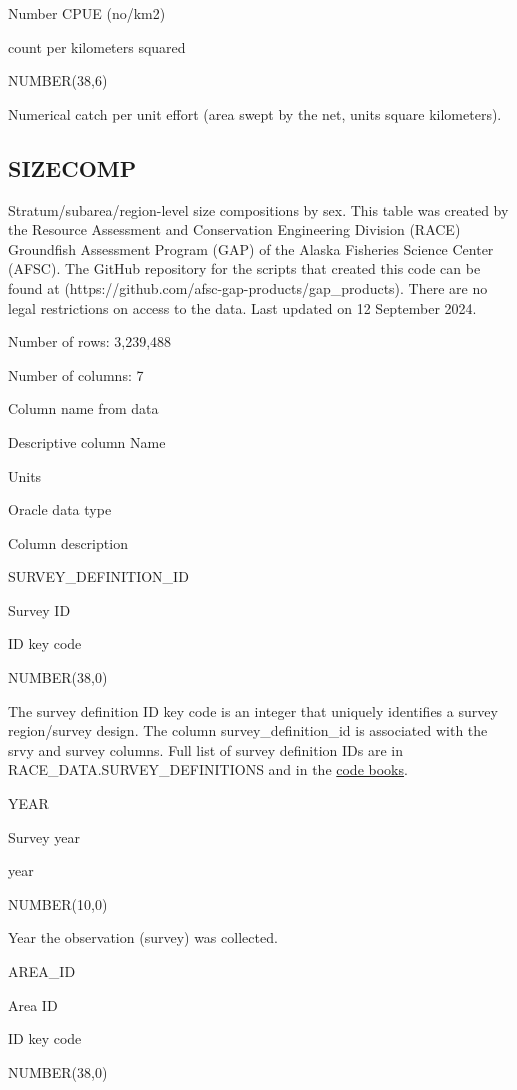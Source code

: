 \documentclass[
  letterpaper,
  oneside,
  open=any]{scrbook}
\begin{document}
Number CPUE (no/km2)

count per kilometers squared

NUMBER(38,6)

Numerical catch per unit effort (area swept by the net, units square
kilometers).

\subsection{SIZECOMP}\label{sizecomp}

Stratum/subarea/region-level size compositions by sex. This table was
created by the Resource Assessment and Conservation Engineering Division
(RACE) Groundfish Assessment Program (GAP) of the Alaska Fisheries
Science Center (AFSC). The GitHub repository for the scripts that
created this code can be found at
(https://github.com/afsc-gap-products/gap\_products). There are no legal
restrictions on access to the data. Last updated on 12 September 2024.

Number of rows: 3,239,488

Number of columns: 7

Column name from data

Descriptive column Name

Units

Oracle data type

Column description

SURVEY\_DEFINITION\_ID

Survey ID

ID key code

NUMBER(38,0)

The survey definition ID key code is an integer that uniquely identifies
a survey region/survey design. The column survey\_definition\_id is
associated with the srvy and survey columns. Full list of survey
definition IDs are in RACE\_DATA.SURVEY\_DEFINITIONS and in the
\href{https://www.fisheries.noaa.gov/resource/document/groundfish-survey-species-code-manual-and-data-codes-manual}{code
books}.

YEAR

Survey year

year

NUMBER(10,0)

Year the observation (survey) was collected.

AREA\_ID

Area ID

ID key code

NUMBER(38,0)
\end{document}
